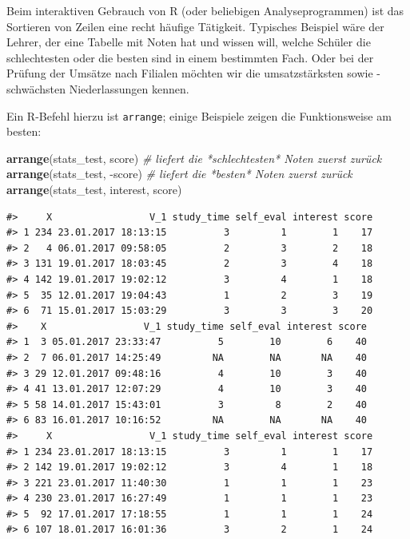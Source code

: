 \documentclass[12pt,ngerman,]{book}
\makeatletter
\newenvironment{Shaded}{\begin{snugshade}}{\end{snugshade}}
\newcommand{\KeywordTok}[1]{\textcolor[rgb]{0.13,0.29,0.53}{\textbf{{#1}}}}
\newcommand{\CommentTok}[1]{\textcolor[rgb]{0.56,0.35,0.01}{\textit{{#1}}}}
\newcommand{\NormalTok}[1]{{#1}}
\newenvironment{kframe}{%
\medskip{}
\setlength{\fboxsep}{.8em}
 \def\at@end@of@kframe{}%
 \ifinner\ifhmode%
  \def\at@end@of@kframe{\end{minipage}}%
  \begin{minipage}{\columnwidth}%
 \fi\fi%
 \def\FrameCommand##1{\hskip\@totalleftmargin \hskip-\fboxsep
 \colorbox{shadecolor}{##1}\hskip-\fboxsep
     \hskip-\linewidth \hskip-\@totalleftmargin \hskip\columnwidth}%
 \MakeFramed {\advance\hsize-\width
   \@totalleftmargin\z@ \linewidth\hsize
   \@setminipage}}%
 {\par\unskip\endMakeFramed%
 \at@end@of@kframe}
\renewenvironment{Shaded}{\begin{kframe}}{\end{kframe}}
\makeatother
\begin{document}
Beim interaktiven Gebrauch von R (oder beliebigen Analyseprogrammen) ist
das Sortieren von Zeilen eine recht häufige Tätigkeit. Typisches
Beispiel wäre der Lehrer, der eine Tabelle mit Noten hat und wissen
will, welche Schüler die schlechtesten oder die besten sind in einem
bestimmten Fach. Oder bei der Prüfung der Umsätze nach Filialen möchten
wir die umsatzstärksten sowie -schwächsten Niederlassungen kennen.

Ein R-Befehl hierzu ist \texttt{arrange}; einige
Beispiele zeigen die Funktionsweise am besten:

\begin{Shaded}
\begin{Highlighting}[]

\KeywordTok{arrange}\NormalTok{(stats_test, score) }\CommentTok{# liefert die *schlechtesten* Noten zuerst zurück}
\KeywordTok{arrange}\NormalTok{(stats_test, -score) }\CommentTok{# liefert die *besten* Noten zuerst zurück}
\KeywordTok{arrange}\NormalTok{(stats_test, interest, score)}
\end{Highlighting}
\end{Shaded}

\begin{verbatim}
#>     X                 V_1 study_time self_eval interest score
#> 1 234 23.01.2017 18:13:15          3         1        1    17
#> 2   4 06.01.2017 09:58:05          2         3        2    18
#> 3 131 19.01.2017 18:03:45          2         3        4    18
#> 4 142 19.01.2017 19:02:12          3         4        1    18
#> 5  35 12.01.2017 19:04:43          1         2        3    19
#> 6  71 15.01.2017 15:03:29          3         3        3    20
#>    X                 V_1 study_time self_eval interest score
#> 1  3 05.01.2017 23:33:47          5        10        6    40
#> 2  7 06.01.2017 14:25:49         NA        NA       NA    40
#> 3 29 12.01.2017 09:48:16          4        10        3    40
#> 4 41 13.01.2017 12:07:29          4        10        3    40
#> 5 58 14.01.2017 15:43:01          3         8        2    40
#> 6 83 16.01.2017 10:16:52         NA        NA       NA    40
#>     X                 V_1 study_time self_eval interest score
#> 1 234 23.01.2017 18:13:15          3         1        1    17
#> 2 142 19.01.2017 19:02:12          3         4        1    18
#> 3 221 23.01.2017 11:40:30          1         1        1    23
#> 4 230 23.01.2017 16:27:49          1         1        1    23
#> 5  92 17.01.2017 17:18:55          1         1        1    24
#> 6 107 18.01.2017 16:01:36          3         2        1    24
\end{verbatim}
\end{document}

